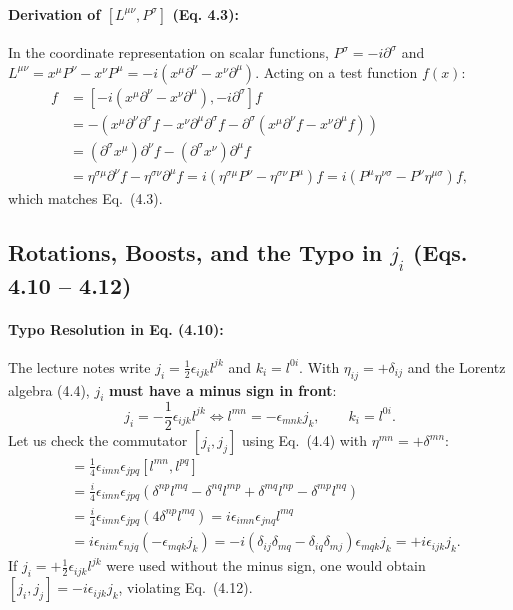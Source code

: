 \documentclass[11pt,a4paper]{article}
\begin{document}
\paragraph{Derivation of $[L^{\mu\nu}, P^\sigma]$ (Eq. 4.3):}
In the coordinate representation on scalar functions, $P^\sigma = -i\partial^\sigma$ and $L^{\mu\nu} = x^\mu P^\nu - x^\nu P^\mu = -i(x^\mu \partial^\nu - x^\nu \partial^\mu)$. Acting on a test function $f(x)$:
\begin{align}
    [L^{\mu\nu}, P^\sigma]f &= \left[-i(x^\mu \partial^\nu - x^\nu \partial^\mu), -i\partial^\sigma\right]f \nonumber \\
    &= -\left(x^\mu \partial^\nu \partial^\sigma f - x^\nu \partial^\mu \partial^\sigma f - \partial^\sigma(x^\mu \partial^\nu f - x^\nu \partial^\mu f)\right) \nonumber \\
    &= (\partial^\sigma x^\mu)\partial^\nu f - (\partial^\sigma x^\nu)\partial^\mu f \nonumber \\
    &= \eta^{\sigma\mu}\partial^\nu f - \eta^{\sigma\nu}\partial^\mu f = i\left(\eta^{\sigma\mu}P^\nu - \eta^{\sigma\nu}P^\mu\right)f = i\left(P^\mu\eta^{\nu\sigma} - P^\nu\eta^{\mu\sigma}\right)f,
\end{align}
which matches Eq.~(4.3).

\subsection{Rotations, Boosts, and the Typo in $j_i$ (Eqs. 4.10 -- 4.12)}
\paragraph{Typo Resolution in Eq. (4.10):}
The lecture notes write $j_i = \frac{1}{2}\epsilon_{ijk}l^{jk}$ and $k_i = l^{0i}$. With $\eta_{ij} = +\delta_{ij}$ and the Lorentz algebra (4.4), $j_i$ \textbf{must have a minus sign in front}:
\begin{equation}
    j_i = -\frac{1}{2}\epsilon_{ijk}l^{jk} \iff l^{mn} = -\epsilon_{mnk}j_k, \qquad k_i = l^{0i}.
\end{equation}
Let us check the commutator $[j_i, j_j]$ using Eq.~(4.4) with $\eta^{mn} = +\delta^{mn}$:
\begin{align}
    [j_i, j_j] &= \frac{1}{4}\epsilon_{imn}\epsilon_{jpq}[l^{mn}, l^{pq}] \nonumber \\
    &= \frac{i}{4}\epsilon_{imn}\epsilon_{jpq}\left(\delta^{np}l^{mq} - \delta^{nq}l^{mp} + \delta^{mq}l^{np} - \delta^{mp}l^{nq}\right) \nonumber \\
    &= \frac{i}{4}\epsilon_{imn}\epsilon_{jpq}\left(4\delta^{np}l^{mq}\right) = i\epsilon_{imn}\epsilon_{jnq}l^{mq} \nonumber \\
    &= i\epsilon_{nim}\epsilon_{njq}\left(-\epsilon_{mqk}j_k\right) = -i\left(\delta_{ij}\delta_{mq} - \delta_{iq}\delta_{mj}\right)\epsilon_{mqk}j_k = +i\epsilon_{ijk}j_k.
\end{align}
If $j_i = +\frac{1}{2}\epsilon_{ijk}l^{jk}$ were used without the minus sign, one would obtain $[j_i, j_j] = -i\epsilon_{ijk}j_k$, violating Eq.~(4.12).
\end{document}

